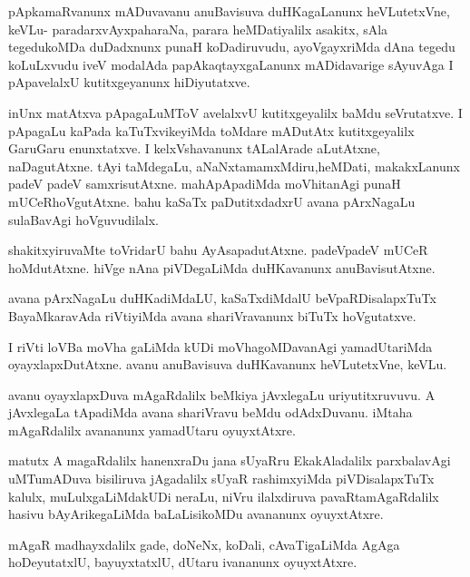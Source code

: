 \documentclass{article}
\begin{document}
\begin{mn}
pApkamaRvanunx mADuvavanu anuBavisuva duHKagaLanunx heVLutetxVne, 
keVLu- paradarxvAyxpaharaNa, parara  heMDatiyalilx asakitx, sAla tegedukoMDa 
duDadxnunx punaH koDadiruvudu, ayoVgayxriMda dAna tegedu koLuLxvudu iveV modalAda 
papAkaqtayxgaLanunx mADidavarige  sAyuvAga I pApavelalxU kutitxgeyanunx hiDiyutatxve.
\end{mn}

\begin{mn}
inUnx matAtxva pApagaLuMToV avelalxvU kutitxgeyalilx baMdu seVrutatxve.  
I pApagaLu kaPada kaTuTxvikeyiMda  toMdare mADutAtx kutitxgeyalilx GaruGaru 
enunxtatxve.  I kelxVshavanunx tALalArade aLutAtxne, naDagutAtxne.  tAyi 
taMdegaLu, aNaNxtamamxMdiru,heMDati, makakxLanunx  padeV padeV samxrisutAtxne.  
mahApApadiMda moVhitanAgi punaH mUCeRhoVgutAtxne. bahu kaSaTx 
paDutitxdadxrU avana pArxNagaLu sulaBavAgi hoVguvudilalx. 
\end{mn}

\begin{mn}
shakitxyiruvaMte toVridarU bahu AyAsapadutAtxne. padeVpadeV mUCeR hoMdutAtxne.  
hiVge nAna piVDegaLiMda duHKavanunx anuBavisutAtxne.
\end{mn}

\begin{mn}
avana pArxNagaLu duHKadiMdaLU, kaSaTxdiMdalU beVpaRDisalapxTuTx BayaMkaravAda 
riVtiyiMda avana  shariVravanunx  biTuTx hoVgutatxve. 
\end{mn}

\begin{mn}
I riVti loVBa moVha gaLiMda kUDi moVhagoMDavanAgi yamadUtariMda  
oyayxlapxDutAtxne.  avanu  anuBavisuva duHKavanunx heVLutetxVne,  keVLu.
\end{mn}

\begin{mn}
avanu oyayxlapxDuva mAgaRdalilx beMkiya jAvxlegaLu  uriyutitxruvuvu.  
A jAvxlegaLa tApadiMda avana shariVravu beMdu odAdxDuvanu.  iMtaha 
mAgaRdalilx avananunx yamadUtaru  oyuyxtAtxre.
\end{mn}

\begin{mn}
matutx A magaRdalilx hanenxraDu jana sUyaRru EkakAladalilx parxbalavAgi 
uMTumADuva bisiliruva jAgadalilx  sUyaR rashimxyiMda piVDisalapxTuTx kalulx, 
muLulxgaLiMdakUDi neraLu, niVru ilalxdiruva pavaRtamAgaRdalilx hasivu 
bAyArikegaLiMda baLaLisikoMDu avananunx oyuyxtAtxre.
\end{mn}

\begin{mn}
mAgaR madhayxdalilx gade, doNeNx, koDali, cAvaTigaLiMda AgAga hoDeyutatxlU, 
bayuyxtatxlU, dUtaru ivananunx oyuyxtAtxre.
\end{mn}
\end{document}

